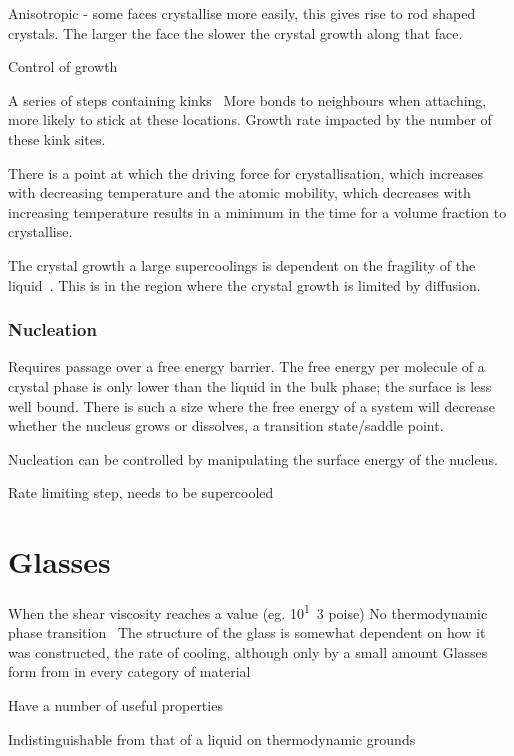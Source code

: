 Anisotropic - some faces crystallise more easily, this gives rise to rod shaped crystals.
The larger the face the slower the crystal growth along that face.

Control of growth~\cite{de-yoreo:03}

A series of steps containing kinks~\cite{chernov:61} More bonds to neighbours when attaching, more likely to stick at these locations. Growth rate impacted by the number of these kink sites.

There is a point at which the driving force for crystallisation, which increases with decreasing temperature and the atomic mobility, which decreases with increasing temperature results in a minimum in the time for a volume fraction to crystallise.~\cite{uhlmann:72}
\begin{figure}
\end{figure}

The crystal growth a large supercoolings is dependent on the fragility of the liquid~\cite{ediger:08}. This is in the region where the crystal growth is limited by diffusion. 


\subsubsection{Nucleation}
Requires passage over a free energy barrier. The free energy per molecule of a crystal phase is only lower than the liquid in the bulk phase; the surface is less well bound. There is such a size where the free energy of a system will decrease whether the nucleus grows or dissolves, a transition state/saddle point.

Nucleation can be controlled by manipulating the surface energy of the nucleus.~\cite{de-yoreo:03}
 
Rate limiting step, needs to be supercooled
 
\section{Glasses}
When the shear viscosity reaches a value (eg. \si{10^13} poise)
No thermodynamic phase transition~\cite{santen:00}
The structure of the glass is somewhat dependent on how it was constructed, the rate of cooling, although only by a small amount
Glasses form from in every category of material~\cite{turnbull:69}

Have a number of useful properties~\cite{greer:07}

Indistinguishable from that of a liquid on thermodynamic grounds~\cite{santen:00}

